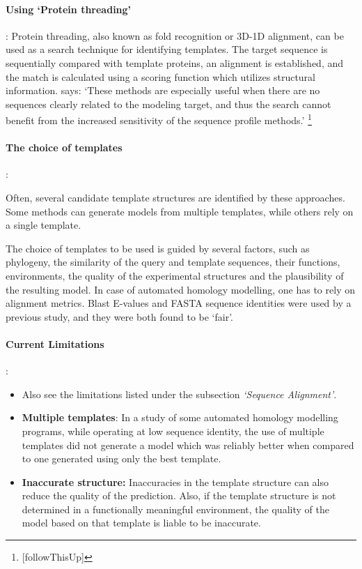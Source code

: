 \documentclass[10pt]{report}
\begin{document}
\paragraph{Using `Protein threading'}: Protein threading, also known as fold recognition or 3D-1D alignment, can be used as a search technique for identifying templates. The target sequence is sequentially compared with template proteins, an alignment is established, and the match is calculated using a scoring function which utilizes structural information. \cite{marti-renom2000com} says: `These methods are especially useful when there are no sequences clearly related to the modeling target, and thus the search cannot benefit from the increased sensitivity of the sequence profile methods.' \footnote{[followThisUp]}

\paragraph{The choice of templates}:

Often, several candidate template structures are identified by these approaches. Some methods can generate models from multiple templates, while others rely on a single template.

The choice of templates to be used is guided by several factors, such as phylogeny, the similarity of the query and template sequences, their functions, environments, the quality of the experimental structures and the plausibility of the resulting model. In case of automated homology modelling, one has to rely on alignment metrics. Blast E-values and FASTA sequence identities were used by a previous study, and they were both found to be `fair'.\cite{dalton07} 

\paragraph{Current Limitations}: 

\begin{itemize}

\item Also see the limitations listed under the subsection \textit{`Sequence Alignment'}.

\item \textbf{Multiple templates}: In a study of some automated homology modelling programs, while operating at low sequence identity, the use of multiple templates did not generate a model which was reliably better when compared to one generated using only the best template.\cite{dalton07}

\item \textbf{Inaccurate structure:} Inaccuracies in the template structure can also reduce the quality of the prediction. Also, if the template structure is not determined in a functionally meaningful environment, the quality of the model based on that template is liable to be inaccurate. \cite{marti-renom2000com}

\end{itemize}
\end{document}
